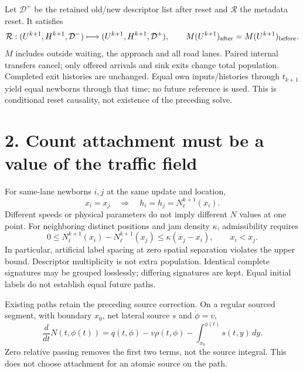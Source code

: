 \documentclass[11pt,a4paper]{article}
\begin{document}
Let $\mathcal D^+$ be the retained old/new descriptor list after reset and
$\mathcal R$ the metadata reset. It satisfies
\begin{equation}
 \mathcal R:(U^{k+1},H^{k+1},\mathcal D^-)\longmapsto
 (U^{k+1},H^{k+1},\mathcal D^+),\qquad
 M(U^{k+1})_{\rm after}=M(U^{k+1})_{\rm before}.
\end{equation}
$M$ includes outside waiting, the approach and all road lanes. Paired internal
transfers cancel; only offered arrivals and sink exits change total population.
Completed exit histories are unchanged. Equal own inputs/histories through
$t_{k+1}$ yield equal newborns through that time; no future reference is used.
This is conditional reset causality, not existence of the preceding solve.

\newpage
\section*{2. Count attachment must be a value of the traffic field}
For same-lane newborns $i,j$ at the same update and location,
\begin{equation}
 x_i=x_j\quad\Longrightarrow\quad
 h_i=h_j=N_{\ell}^{k+1}(x_i).
\end{equation}
Different speeds or physical parameters do not imply different $N$ values at
one point. For neighboring distinct positions and jam density $\kappa$,
admissibility requires
\begin{equation}
 0\le N_{\ell}^{k+1}(x_i)-N_{\ell}^{k+1}(x_j)
 \le \kappa(x_j-x_i),\qquad x_i<x_j .
\end{equation}
In particular, artificial label spacing at zero spatial separation violates
the upper bound. Descriptor multiplicity is not extra population.
Identical complete signatures may be grouped losslessly; differing signatures
are kept. Equal initial labels do not establish equal future paths.

Existing paths retain the preceding source correction. On a regular sourced
segment, with boundary $x_0$, net lateral source $s$ and $\dot\phi=v$,
\begin{equation}
 \frac{d}{dt}N(t,\phi(t))
 =q(t,\phi)-v\rho(t,\phi)-\int_{x_0}^{\phi(t)}s(t,y)\,dy .
\end{equation}
Zero relative passing removes the first two terms, not the source integral.
This does not choose attachment for an atomic source on the path.
\end{document}
